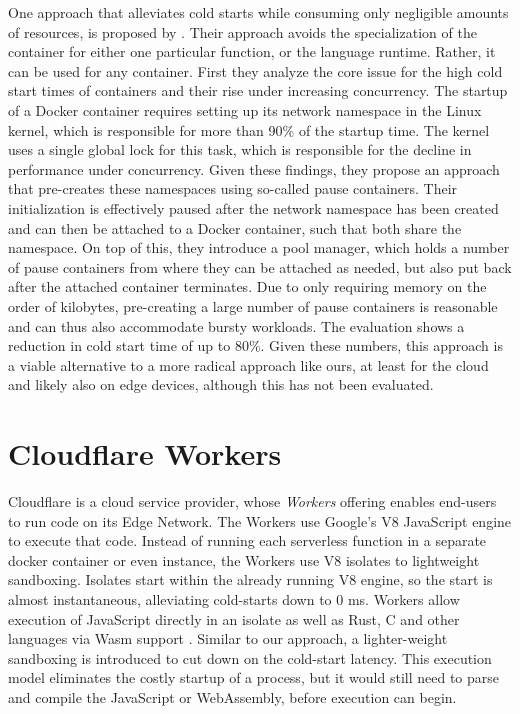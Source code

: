 One approach that alleviates cold starts while consuming only negligible amounts of resources, is proposed by \citeauthor{Mohan2019} \cite{Mohan2019}. Their approach avoids the specialization of the container for either one particular function, or the language runtime. Rather, it can be used for any container. First they analyze the core issue for the high cold start times of containers and their rise under increasing concurrency. The startup of a Docker container requires setting up its network namespace in the Linux kernel, which is responsible for more than 90\% of the startup time. The kernel uses a single global lock for this task, which is responsible for the decline in performance under concurrency. Given these findings, they propose an approach that pre-creates these namespaces using so-called pause containers. Their initialization is effectively paused after the network namespace has been created and can then be attached to a Docker container, such that both share the namespace. On top of this, they introduce a pool manager, which holds a number of pause containers from where they can be attached as needed, but also put back after the attached container terminates. Due to only requiring memory on the order of kilobytes, pre-creating a large number of pause containers is reasonable and can thus also accommodate bursty workloads. The evaluation shows a reduction in cold start time of up to 80\%. Given these numbers, this approach is a viable alternative to a more radical approach like ours, at least for the cloud and likely also on edge devices, although this has not been evaluated.



\section{Cloudflare Workers}

Cloudflare is a cloud service provider, whose \emph{Workers} offering enables end-users to run code on its Edge Network. The Workers use Google's V8 JavaScript engine to execute that code.
Instead of running each serverless function in a separate docker container or even  instance, the Workers use V8 isolates to lightweight sandboxing. Isolates start within the already running V8 engine, so the start is almost instantaneous, alleviating cold-starts down to 0 ms.
Workers allow execution of JavaScript directly in an isolate as well as Rust, C and other languages via Wasm support \cite{Cloudflare2021}.
Similar to our approach, a lighter-weight sandboxing is introduced to cut down on the cold-start latency. This execution model eliminates the costly startup of a  process, but it would still need to parse and compile the JavaScript or WebAssembly, before execution can begin.


